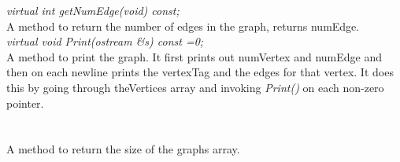 {\em virtual int getNumEdge(void) const;} \\
A method to return the number of edges in the graph, returns numEdge. \\


{\em virtual void Print(ostream \&s) const =0;} \\
A method to print the graph. It first prints out numVertex and numEdge
and then on each newline prints the vertexTag and the edges for that
vertex. It does this by going through theVertices array and invoking
{\em Print()}  on each non-zero pointer.\\

  \\
 \\
A method to return the size of the graphs array. \\





